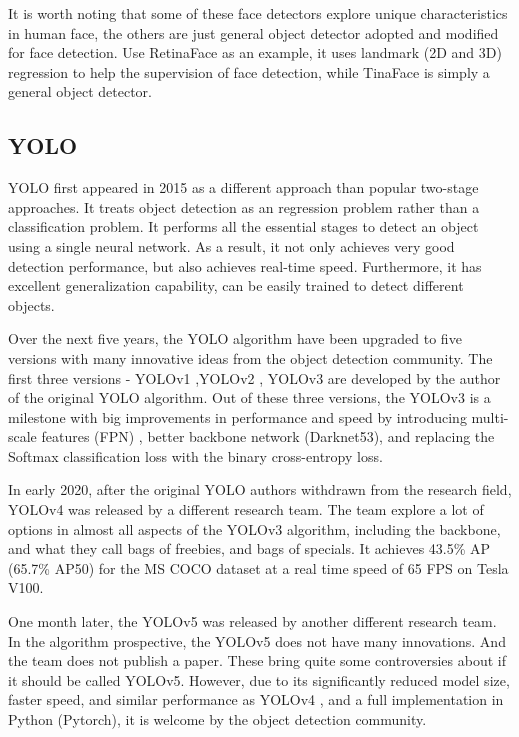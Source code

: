 \documentclass[conference]{IEEEtran}
\begin{document}
It is worth noting that some of these face detectors explore unique characteristics in human face, the others are just general object detector adopted and modified for face detection. Use RetinaFace \cite{RetinaFace} as an example, it uses landmark (2D and 3D) regression to help the supervision of face detection, while TinaFace \cite{TinaFace} is simply a general object detector. 

\subsection {YOLO}

YOLO first appeared in 2015 \cite{YOLOv1} as a different approach than popular two-stage approaches. It treats object detection as an regression problem rather than a classification problem.  It performs all the essential stages to detect an object using a single neural network. As a result, it not only achieves very good detection performance, but also achieves real-time speed. Furthermore, it has excellent generalization capability, can be easily trained to detect different objects. 

Over the next five years, the YOLO algorithm have been upgraded to five versions with many innovative ideas from the object detection community. The first three versions - YOLOv1 \cite{YOLOv1},YOLOv2 \cite{YOLOv2}, YOLOv3 \cite{YOLOv3}are developed by the author of the original YOLO algorithm. Out of these three versions, the YOLOv3 \cite{YOLOv3} is a milestone with big improvements in performance and speed by introducing multi-scale features (FPN) \cite{FPN}, better backbone network (Darknet53), and replacing the Softmax classification loss with the binary cross-entropy loss.  

In early 2020, after the original YOLO authors withdrawn from the research field, YOLOv4 \cite{YOLOv4} was released by a different research team. The team explore a lot of options in almost all aspects of the YOLOv3 \cite{YOLOv3} algorithm, including the backbone, and what they call bags of freebies, and bags of specials. It achieves 43.5\% AP (65.7\% AP50) for the MS COCO dataset at a real time speed of 65 FPS on Tesla V100.  

One month later, the YOLOv5 \cite{YOLOv5} was released by another different research team. In the algorithm prospective, the YOLOv5 \cite{YOLOv5} does not have many innovations. And the team does not publish a paper. These bring quite some controversies about if it should be called YOLOv5. However, due to its significantly reduced model size, faster speed, and similar performance as YOLOv4 \cite{YOLOv4}, and a full implementation in Python (Pytorch), it is welcome by the object detection community. 
\end{document}
